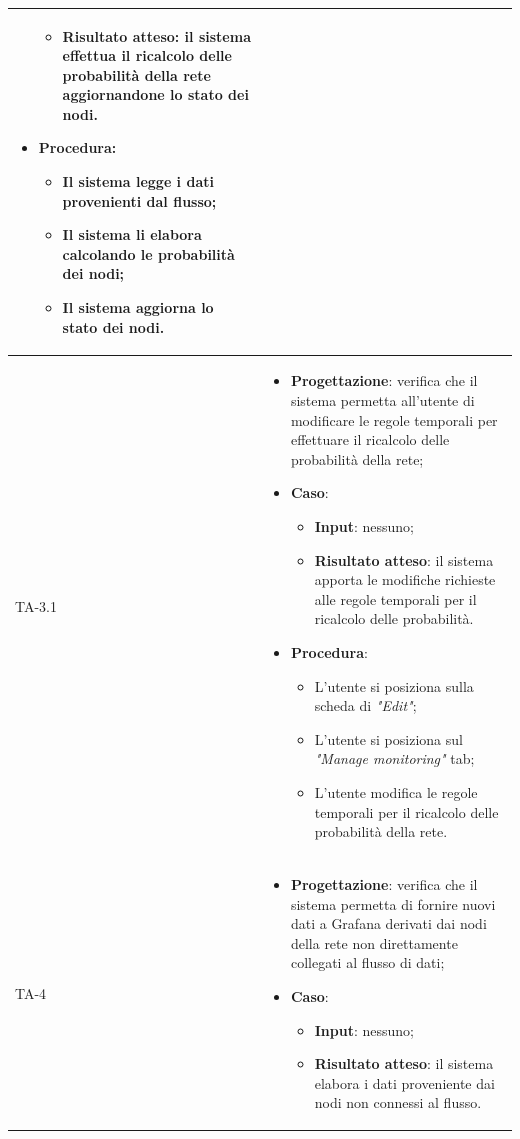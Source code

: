 \begin{longtable}{|C{2.5cm}|C{13cm}|}
\begin{itemize}
\begin{itemize}
		\item \textbf{Risultato atteso}: il sistema effettua il ricalcolo delle probabilità della rete aggiornandone lo stato dei nodi.
	\end{itemize}
	\item \textbf{Procedura}:
	\begin{itemize}
		\item Il sistema legge i dati provenienti dal flusso;
		\item Il sistema li elabora calcolando le probabilità dei nodi;
		\item Il sistema aggiorna lo stato dei nodi.
	\end{itemize} 
\end{itemize}\\
\hline
{TA-3.1} &
\begin{itemize}
	\item \textbf{Progettazione}: verifica che il sistema permetta all'utente di modificare le regole temporali per effettuare il ricalcolo delle probabilità della rete;
	\item \textbf{Caso}: 
	\begin{itemize}
		\item \textbf{Input}: nessuno;
		\item \textbf{Risultato atteso}: il sistema apporta le modifiche richieste alle regole temporali per il ricalcolo delle probabilità.
	\end{itemize}
	\item \textbf{Procedura}:
	\begin{itemize}
		\item L'utente si posiziona sulla scheda di \emph{"Edit"};
		\item L'utente si posiziona sul \emph{"Manage monitoring"} tab;
		\item L'utente modifica le regole temporali per il ricalcolo delle probabilità della rete.
	\end{itemize} 
\end{itemize} \\
\hline
{TA-4} &
\begin{itemize}
	\item \textbf{Progettazione}: verifica che il sistema permetta di fornire nuovi dati a Grafana derivati dai nodi della rete non direttamente collegati al flusso di
	dati;
	\item \textbf{Caso}: 
	\begin{itemize}
		\item \textbf{Input}: nessuno;
		\item \textbf{Risultato atteso}: il sistema elabora i dati proveniente dai nodi non connessi al flusso.

\end{itemize}
\end{itemize}
\end{longtable}
